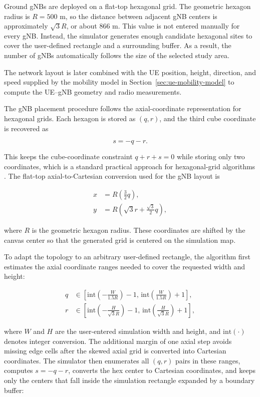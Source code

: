 Ground gNBs are deployed on a flat-top hexagonal grid. The geometric hexagon radius is \(R=500\) m, so the distance between adjacent gNB centers is approximately \(\sqrt{3}R\), or about 866 m. This value is not entered manually for every gNB. Instead, the simulator generates enough candidate hexagonal sites to cover the user-defined rectangle and a surrounding buffer. As a result, the number of gNBs automatically follows the size of the selected study area.

The network layout is later combined with the UE position, height, direction, and speed supplied by the mobility model in Section~\ref{sec:ue-mobility-model} to compute the UE--gNB geometry and radio measurements.

The gNB placement procedure follows the axial-coordinate representation for hexagonal grids. Each hexagon is stored as \((q,r)\), and the third cube coordinate is recovered as

\begin{equation}
    s=-q-r.
\end{equation}

This keeps the cube-coordinate constraint \(q+r+s=0\) while storing only two coordinates, which is a standard practical approach for hexagonal-grid algorithms \cite{redblob_hexagons}. The flat-top axial-to-Cartesian conversion used for the gNB layout is

\begin{align}
    x &= R\left(\frac{3}{2}q\right),\\
    y &= R\left(\sqrt{3}r+\frac{\sqrt{3}}{2}q\right),
\end{align}

where \(R\) is the geometric hexagon radius. These coordinates are shifted by the canvas center so that the generated grid is centered on the simulation map.

To adapt the topology to an arbitrary user-defined rectangle, the algorithm first estimates the axial coordinate ranges needed to cover the requested width and height:

\begin{align}
    q &\in \left[
    \mathrm{int}\left(-\frac{W}{1.5R}\right)-1,\,
    \mathrm{int}\left(\frac{W}{1.5R}\right)+1
    \right],\\
    r &\in \left[
    \mathrm{int}\left(-\frac{H}{\sqrt{3}R}\right)-1,\,
    \mathrm{int}\left(\frac{H}{\sqrt{3}R}\right)+1
    \right],
\end{align}

where \(W\) and \(H\) are the user-entered simulation width and height, and \(\mathrm{int}(\cdot)\) denotes integer conversion. The additional margin of one axial step avoids missing edge cells after the skewed axial grid is converted into Cartesian coordinates. The simulator then enumerates all \((q,r)\) pairs in these ranges, computes \(s=-q-r\), converts the hex center to Cartesian coordinates, and keeps only the centers that fall inside the simulation rectangle expanded by a boundary buffer:


